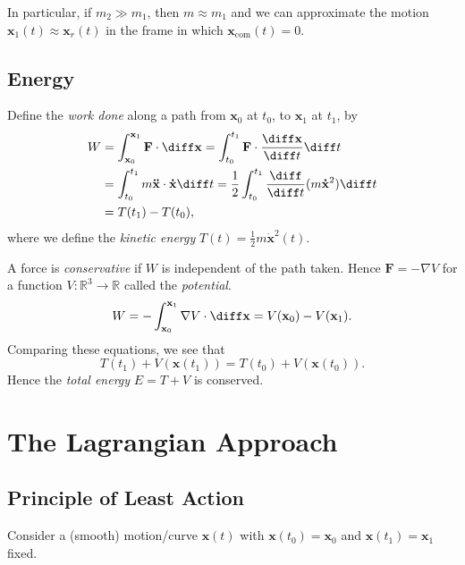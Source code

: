 \documentclass[12pt]{article}
\begin{document}
In particular, if $m_2 \gg m_1$, then $m \approx m_1$ and we can approximate the motion $\mathbf{x}_1(t) \approx \mathbf{x}_r(t)$ in the frame in which $\mathbf{x}_{\mathrm{com}}(t) = 0$.


\subsection{Energy}
\label{sub:energy}

Define the \emph{work done} along a path from $\mathbf{x}_0$ at $t_0$, to $\mathbf{x}_1$ at $t_1$, by
\begin{align*}
	W &= \int_{\mathbf{x}_0}^{\mathbf{x}_1} \mathbf{F} \cdot \diff \mathbf{x} = \int_{t_0}^{t_1} \mathbf{F} \cdot \frac{\diff \mathbf{x}}{\diff t} \diff t \\
	  &= \int_{t_0}^{t_1} m \mathbf{\ddot x} \cdot \mathbf{\dot x} \diff t = \frac{1}{2} \int_{t_0}^{t_1} \frac{\diff}{\diff t} (m \mathbf{\dot x}^2) \diff t \\
	  &= T(t_1) - T(t_0),
\end{align*}
where we define the \emph{kinetic energy} $T(t) = \frac{1}{2} m \mathbf{\dot x}^2 (t)$.

A force is \emph{conservative} if $W$ is independent of the path taken. Hence $\mathbf{F} = - \nabla V$ for a function $V : \mathbb{R}^3 \to \mathbb{R}$ called the \emph{potential}.
\[
W = - \int_{\mathbf{x}_0}^{\mathbf{x}_1} \nabla V \cdot \diff \mathbf{x} = V(\mathbf{x}_0) - V(\mathbf{x}_1).
\]
Comparing these equations, we see that
\[
T(t_1) + V(\mathbf{x}(t_1)) = T(t_0) + V(\mathbf{x}(t_0)).
\]
Hence the \emph{total energy} $E = T + V$ is conserved.

\newpage

\section{The Lagrangian Approach}
\label{sec:lagrange}

\subsection{Principle of Least Action}
\label{sub:least_action}

Consider a (smooth) motion/curve $\mathbf{x}(t)$ with $\mathbf{x}(t_0) = \mathbf{x}_0$ and $\mathbf{x}(t_1)= \mathbf{x}_1$ fixed.
\end{document}
